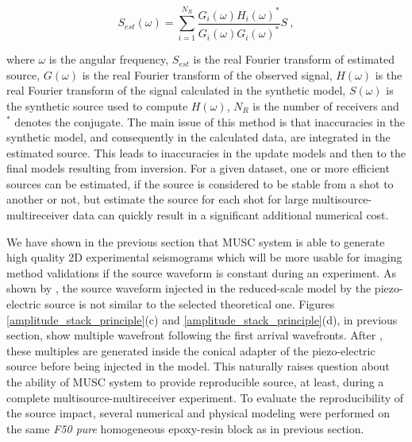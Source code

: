 \documentclass[manuscript,revised]{geophysics}
\begin{document}
\begin{equation}
	S_{est}(\omega)=\sum\limits_{i=1}^{N_{R}}\frac{G_{i}(\omega)H_{i}(\omega)^{*}}{G_{i}(\omega)G_{i}(\omega)^{*}}S\ ,
	\label{eq:lswe}
\end{equation}

\noindent where $\omega$ is the angular frequency, $S_{est}$ is the real Fourier transform of estimated source, $G(\omega)$ is the real Fourier transform of the observed signal, $H(\omega)$ is the real Fourier transform of the signal calculated in the synthetic model, $S(\omega)$ is the synthetic source used to compute $H(\omega)$, $N_{R}$ is the number of receivers and $^{*}$ denotes the conjugate. The main issue of this method is that inaccuracies in the synthetic model, and consequently in the calculated data, are integrated in the estimated source. This leads to inaccuracies in the update models and then to the final models resulting from inversion. For a given dataset, one or more efficient sources can be estimated, if the source is considered to be stable from a shot to another or not, but estimate the source for each shot for large multisource-multireceiver data can quickly result in a significant additional numerical cost.      

\noindent We have shown in the previous section that MUSC system is able to generate high quality 2D experimental seismograms which will be more usable for imaging method validations if the source waveform is constant during an experiment. As shown by \citet{Bretaudeau_SSM_2011}, the source waveform injected in the reduced-scale model by the piezo-electric source is not similar to the selected theoretical one. Figures \ref{amplitude_stack_principle}(c) and \ref{amplitude_stack_principle}(d), in previous section, show multiple wavefront following the first arrival wavefronts. After \citet{Bretaudeau_SSM_2011}, these multiples are generated inside the conical adapter of the piezo-electric source before being injected in the model. This naturally raises question about the ability of MUSC system to provide reproducible source, at least, during a complete multisource-multireceiver experiment. To evaluate the reproducibility of the source impact, several numerical and physical modeling were performed on the same \textit{F50 pure} homogeneous epoxy-resin block as in previous section. 

\end{document}
